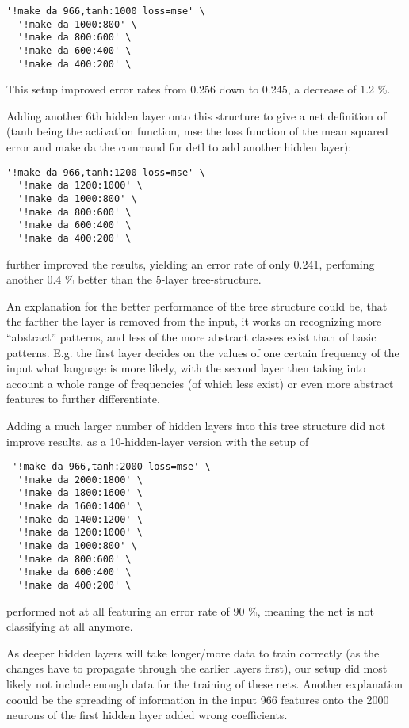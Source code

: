 \begin{verbatim}'!make da 966,tanh:1000 loss=mse' \
  '!make da 1000:800' \
  '!make da 800:600' \
  '!make da 600:400' \
  '!make da 400:200' \
\end{verbatim}

This setup improved error rates from 0.256 down to 0.245, a decrease of 1.2 \%.

Adding another 6th hidden layer onto this structure to give a net definition of (tanh being the activation function, mse the loss function of the mean squared error and make da the command for detl to add another hidden layer):
\begin{verbatim}'!make da 966,tanh:1200 loss=mse' \
  '!make da 1200:1000' \
  '!make da 1000:800' \
  '!make da 800:600' \
  '!make da 600:400' \
  '!make da 400:200' \
\end{verbatim}

 further improved the results, yielding an error rate of only 0.241, perfoming another 0.4 \% better than the 5-layer tree-structure. 

An explanation for the better performance of the tree structure could be, that the farther the layer is removed from the input, it works on recognizing more ``abstract'' patterns, and less of the more abstract classes exist than of basic patterns. E.g. the first layer decides on the values of one certain frequency of the input what language is more likely, with the second layer then taking into account a whole range of frequencies (of which less exist) or even more abstract features to further differentiate.

Adding a much larger number of hidden layers into this tree structure did not improve results, as a 10-hidden-layer version with the setup of

\begin{verbatim}
 '!make da 966,tanh:2000 loss=mse' \
  '!make da 2000:1800' \
  '!make da 1800:1600' \
  '!make da 1600:1400' \
  '!make da 1400:1200' \
  '!make da 1200:1000' \
  '!make da 1000:800' \
  '!make da 800:600' \
  '!make da 600:400' \
  '!make da 400:200' \
\end{verbatim}

performed not at all featuring an error rate of 90 \%, meaning the net is not classifying at all anymore. 

As deeper hidden layers will take longer/more data to train correctly (as the changes have to propagate through the earlier layers first), our setup did most likely not include enough data for the training of these nets. Another explanation coould be the spreading of information in the input 966 features onto the 2000 neurons of the first hidden layer added wrong coefficients.

